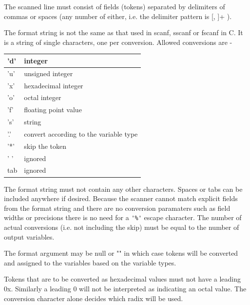 The scanned line must consist of fields (tokens) separated by delimiters of commas
or spaces (any number of either, i.e. the delimiter pattern is [, ]+ ).

The format string is not the same as that used in scanf, sscanf or fscanf in C.
It is a string of single characters, one per conversion. Allowed
conversions are -

\begin{tabular}{| l | l |} 
\hline
'd' & integer                                   \\ \hline
'u' & unsigned integer                          \\ \hline
'x' & hexadecimal integer                       \\ \hline
'o' & octal integer                             \\ \hline
'f' & floating point value                      \\ \hline
's' & string                                    \\ \hline
'.' & convert according to the variable type    \\ \hline
'*' & skip the token                            \\ \hline
' ' & ignored                                   \\ \hline
tab & ignored                                   \\ \hline
\end{tabular}

The format string must not contain any other characters.
Spaces or tabs can be included anywhere if desired. Because the scanner cannot match explicit
fields from the format string and there are no conversion paramaters such as field widths or
precisions there is no need for a \verb"'%'" escape character. The number of actual
conversions (i.e. not including the skip) must be equal to the number of output variables.

The format argument may be null or "" in which case tokens will be converted and
assigned to the variables based on the variable types.

Tokens that are to be converted as hexadecimal values must not have a leading 0x.
Similarly a leading 0 will not be interpreted as indicating an octal value. The
conversion character alone decides which radix will be used.
